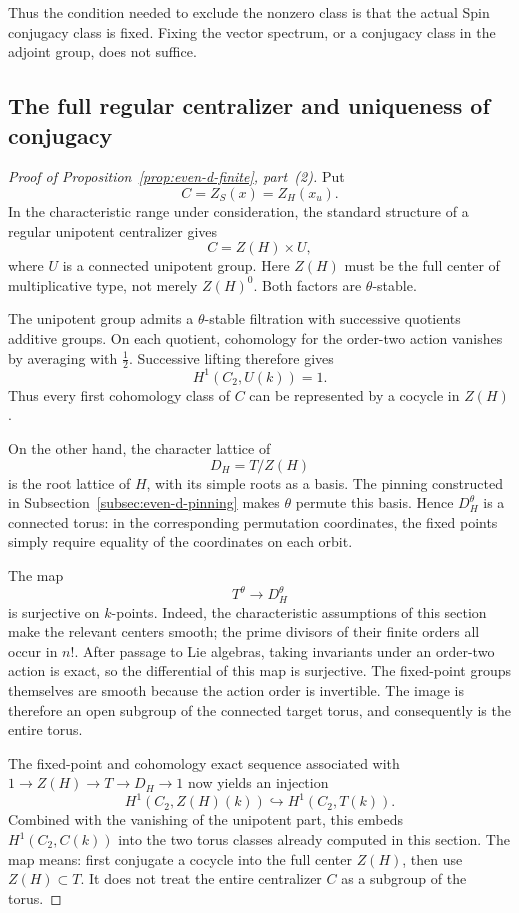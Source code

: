 \documentclass[11pt,a4paper]{article}
\theoremstyle{definition}
\theoremstyle{remark}
\begin{document}
Thus the condition needed to exclude the nonzero class is that the
actual Spin conjugacy class is fixed. Fixing the vector spectrum, or a
conjugacy class in the adjoint group, does not suffice.

\subsection{The full regular centralizer and uniqueness of conjugacy}

\begin{proof}[Proof of Proposition~\ref{prop:even-d-finite}, part~(2)]
Put
\[
C=Z_S(x)=Z_H(x_u).
\]
In the characteristic range under consideration, the standard
structure of a regular unipotent centralizer gives
\[
C=Z(H)\times U,
\]
where \(U\) is a connected unipotent group. Here \(Z(H)\) must be the
full center of multiplicative type, not merely \(Z(H)^0\). Both
factors are \(\theta\)-stable.

The unipotent group admits a \(\theta\)-stable filtration with
successive quotients additive groups. On each quotient, cohomology for
the order-two action vanishes by averaging with \(\frac12\).
Successive lifting therefore gives
\[
H^1(C_2,U(k))=1.
\]
Thus every first cohomology class of \(C\) can be represented by a
cocycle in \(Z(H)\).

On the other hand, the character lattice of
\[
D_H=T/Z(H)
\]
is the root lattice of \(H\), with its simple roots as a basis. The
pinning constructed in
Subsection~\ref{subsec:even-d-pinning} makes \(\theta\) permute this
basis. Hence \(D_H^\theta\) is a connected torus: in the corresponding
permutation coordinates, the fixed points simply require equality of
the coordinates on each orbit.

The map
\[
T^\theta\longrightarrow D_H^\theta
\]
is surjective on \(k\)-points. Indeed, the characteristic assumptions
of this section make the relevant centers smooth; the prime divisors
of their finite orders all occur in \(n!\). After passage to Lie
algebras, taking invariants under an order-two action is exact, so the
differential of this map is surjective. The fixed-point groups
themselves are smooth because the action order is invertible. The
image is therefore an open subgroup of the connected target torus,
and consequently is the entire torus.

The fixed-point and cohomology exact sequence associated with
\(1\to Z(H)\to T\to D_H\to1\) now yields an injection
\[
H^1(C_2,Z(H)(k))
\hookrightarrow H^1(C_2,T(k)).
\]
Combined with the vanishing of the unipotent part, this embeds
\(H^1(C_2,C(k))\) into the two torus classes already computed in this
section. The map means: first conjugate a cocycle into the full center
\(Z(H)\), then use \(Z(H)\subset T\). It does not treat the entire
centralizer \(C\) as a subgroup of the torus.


\end{proof}
\end{document}
